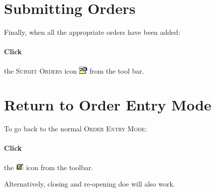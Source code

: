 \section{Submitting Orders}

Finally, when all the appropriate orders have been added:

\paragraph{Click} the \textsc{Submit Orders} icon \includegraphics[height=1em]{graphics/submit_order_icon.png} from the tool bar. \\

\section{Return to Order Entry Mode}

To go back to the normal \textsc{Order Entry Mode}:

\paragraph{Click} the \includegraphics[height=1em]{graphics/order_entry_icon.png} icon from the toolbar.\\


Alternatively, closing and re-opening \gls{doe} will also work.

\dupnote